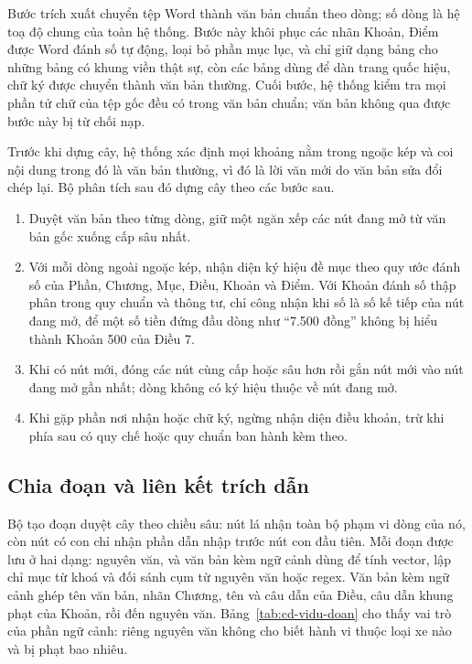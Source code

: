 Bước trích xuất chuyển tệp Word thành văn bản chuẩn theo dòng; số dòng là hệ toạ độ chung của toàn hệ thống. Bước này khôi phục các nhãn Khoản, Điểm được Word đánh số tự động, loại bỏ phần mục lục, và chỉ giữ dạng bảng cho những bảng có khung viền thật sự, còn các bảng dùng để dàn trang quốc hiệu, chữ ký được chuyển thành văn bản thường. Cuối bước, hệ thống kiểm tra mọi phần tử chữ của tệp gốc đều có trong văn bản chuẩn; văn bản không qua được bước này bị từ chối nạp.

Trước khi dựng cây, hệ thống xác định mọi khoảng nằm trong ngoặc kép và coi nội dung trong đó là văn bản thường, vì đó là lời văn mới do văn bản sửa đổi chép lại. Bộ phân tích sau đó dựng cây theo các bước sau.

\begin{enumerate}
    \item Duyệt văn bản theo từng dòng, giữ một ngăn xếp các nút đang mở từ văn bản gốc xuống cấp sâu nhất.
    \item Với mỗi dòng ngoài ngoặc kép, nhận diện ký hiệu đề mục theo quy ước đánh số của Phần, Chương, Mục, Điều, Khoản và Điểm. Với Khoản đánh số thập phân trong quy chuẩn và thông tư, chỉ công nhận khi số là số kế tiếp của nút đang mở, để một số tiền đứng đầu dòng như ``7.500 đồng'' không bị hiểu thành Khoản 500 của Điều 7.
    \item Khi có nút mới, đóng các nút cùng cấp hoặc sâu hơn rồi gắn nút mới vào nút đang mở gần nhất; dòng không có ký hiệu thuộc về nút đang mở.
    \item Khi gặp phần nơi nhận hoặc chữ ký, ngừng nhận diện điều khoản, trừ khi phía sau có quy chế hoặc quy chuẩn ban hành kèm theo.
\end{enumerate}

\subsection{Chia đoạn và liên kết trích dẫn}

Bộ tạo đoạn duyệt cây theo chiều sâu: nút lá nhận toàn bộ phạm vi dòng của nó, còn nút có con chỉ nhận phần dẫn nhập trước nút con đầu tiên. Mỗi đoạn được lưu ở hai dạng: nguyên văn, và văn bản kèm ngữ cảnh dùng để tính vector, lập chỉ mục từ khoá và đối sánh cụm từ nguyên văn hoặc regex. Văn bản kèm ngữ cảnh ghép tên văn bản, nhãn Chương, tên và câu dẫn của Điều, câu dẫn khung phạt của Khoản, rồi đến nguyên văn. Bảng~\ref{tab:cd-vidu-doan} cho thấy vai trò của phần ngữ cảnh: riêng nguyên văn không cho biết hành vi thuộc loại xe nào và bị phạt bao nhiêu.

